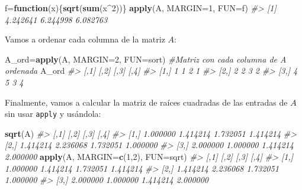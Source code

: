 \documentclass[
]{book}
\newenvironment{Shaded}{\begin{snugshade}}{\end{snugshade}}
\newcommand{\CommentTok}[1]{\textcolor[rgb]{0.56,0.35,0.01}{\textit{#1}}}
\newcommand{\ControlFlowTok}[1]{\textcolor[rgb]{0.13,0.29,0.53}{\textbf{#1}}}
\newcommand{\DataTypeTok}[1]{\textcolor[rgb]{0.13,0.29,0.53}{#1}}
\newcommand{\DecValTok}[1]{\textcolor[rgb]{0.00,0.00,0.81}{#1}}
\newcommand{\KeywordTok}[1]{\textcolor[rgb]{0.13,0.29,0.53}{\textbf{#1}}}
\newcommand{\NormalTok}[1]{#1}
\newcommand{\OperatorTok}[1]{\textcolor[rgb]{0.81,0.36,0.00}{\textbf{#1}}}
\theoremstyle{definition}
\theoremstyle{definition}
\theoremstyle{definition}
\theoremstyle{remark}
\begin{document}
\begin{Shaded}
\begin{Highlighting}[]
\NormalTok{f=}\ControlFlowTok{function}\NormalTok{(x)\{}\KeywordTok{sqrt}\NormalTok{(}\KeywordTok{sum}\NormalTok{(x}\OperatorTok{\^{}}\DecValTok{2}\NormalTok{))\}}
\KeywordTok{apply}\NormalTok{(A, }\DataTypeTok{MARGIN=}\DecValTok{1}\NormalTok{, }\DataTypeTok{FUN=}\NormalTok{f)  }
\CommentTok{\#\textgreater{} [1] 4.242641 6.244998 6.082763}
\end{Highlighting}
\end{Shaded}

Vamos a ordenar cada columna de la matriz \(A\):

\begin{Shaded}
\begin{Highlighting}[]
\NormalTok{A\_ord=}\KeywordTok{apply}\NormalTok{(A, }\DataTypeTok{MARGIN=}\DecValTok{2}\NormalTok{, }\DataTypeTok{FUN=}\NormalTok{sort)  }\CommentTok{\#Matriz con cada columna de A ordenada}
\NormalTok{A\_ord}
\CommentTok{\#\textgreater{}      [,1] [,2] [,3] [,4]}
\CommentTok{\#\textgreater{} [1,]    1    1    2    1}
\CommentTok{\#\textgreater{} [2,]    2    2    3    2}
\CommentTok{\#\textgreater{} [3,]    4    5    3    4}
\end{Highlighting}
\end{Shaded}

Finalmente, vamos a calcular la matriz de raíces cuadradas de las entradas de \(A\)
sin usar \texttt{apply} y usándola:

\begin{Shaded}
\begin{Highlighting}[]
\KeywordTok{sqrt}\NormalTok{(A)  }
\CommentTok{\#\textgreater{}          [,1]     [,2]     [,3]     [,4]}
\CommentTok{\#\textgreater{} [1,] 1.000000 1.414214 1.732051 1.414214}
\CommentTok{\#\textgreater{} [2,] 1.414214 2.236068 1.732051 1.000000}
\CommentTok{\#\textgreater{} [3,] 2.000000 1.000000 1.414214 2.000000}
\KeywordTok{apply}\NormalTok{(A, }\DataTypeTok{MARGIN=}\KeywordTok{c}\NormalTok{(}\DecValTok{1}\NormalTok{,}\DecValTok{2}\NormalTok{), }\DataTypeTok{FUN=}\NormalTok{sqrt)  }
\CommentTok{\#\textgreater{}          [,1]     [,2]     [,3]     [,4]}
\CommentTok{\#\textgreater{} [1,] 1.000000 1.414214 1.732051 1.414214}
\CommentTok{\#\textgreater{} [2,] 1.414214 2.236068 1.732051 1.000000}
\CommentTok{\#\textgreater{} [3,] 2.000000 1.000000 1.414214 2.000000}
\end{Highlighting}
\end{Shaded}
\end{document}
